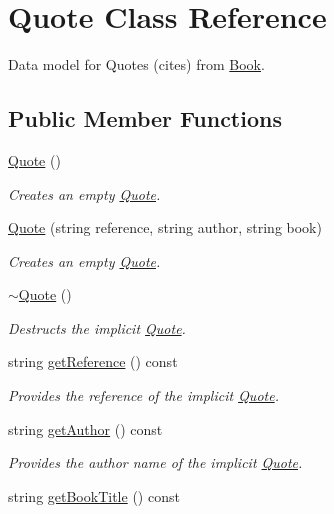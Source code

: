 \hypertarget{class_quote}{}\section{Quote Class Reference}
\label{class_quote}


Data model for Quotes (cites) from \hyperlink{class_book}{Book}.  


\subsection*{Public Member Functions}
\begin{DoxyCompactItemize}
\item 
\hyperlink{class_quote_ae160077e513fe6346eeba294a195038b}{Quote} ()
\begin{DoxyCompactList}\small\item\em Creates an empty \hyperlink{class_quote}{Quote}. \end{DoxyCompactList}\item 
\hyperlink{class_quote_a12fee26be3fcdf003691e394f256b2c8}{Quote} (string reference, string author, string book)
\begin{DoxyCompactList}\small\item\em Creates an empty \hyperlink{class_quote}{Quote}. \end{DoxyCompactList}\item 
\hyperlink{class_quote_a9b4324f3ee83827f2445177c8301482b}{$\sim$\+Quote} ()
\begin{DoxyCompactList}\small\item\em Destructs the implicit \hyperlink{class_quote}{Quote}. \end{DoxyCompactList}\item 
string \hyperlink{class_quote_a4f45d290d8b4d8ebfdf6981b754ec7b7}{get\+Reference} () const 
\begin{DoxyCompactList}\small\item\em Provides the reference of the implicit \hyperlink{class_quote}{Quote}. \end{DoxyCompactList}\item 
string \hyperlink{class_quote_ae29855dc6393689277a9cac61f9f56b8}{get\+Author} () const 
\begin{DoxyCompactList}\small\item\em Provides the author name of the implicit \hyperlink{class_quote}{Quote}. \end{DoxyCompactList}\item 
string \hyperlink{class_quote_a7089d3cf82409928bcdfca5c259facde}{get\+Book\+Title} () const 

\end{DoxyCompactItemize}
